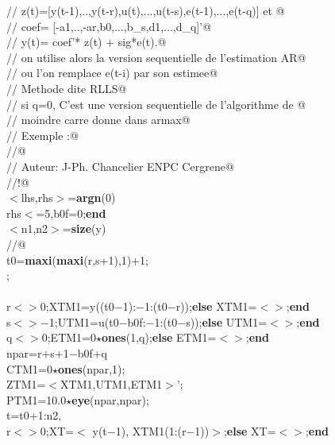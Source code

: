 {\begin{flushleft}
{\cmarg \verb@//        z(t)=[y(t-1),..,y(t-r),u(t),...,u(t-s),e(t-1),...,e(t-q)] et @\\ 
\cmarg \verb@//     coef= [-a1,..,-ar,b0,...,b\_s,d1,...,d\_q]'@\\ 
\cmarg \verb@//     y(t)= coef'* z(t) + sig*e(t).@\\ 
\cmarg \verb@//     on utilise alors la version sequentielle de l'estimation AR@\\ 
\cmarg \verb@//     ou l'on remplace e(t-i) par son estimee@\\ 
\cmarg \verb@//     Methode dite RLLS@\\ 
\cmarg \verb@//     si q=0, C'est une version sequentielle de l'algorithme de @\\ 
\cmarg \verb@//     moindre carre donne dans armax@\\ 
\cmarg \verb@// Exemple :@\\ 
\cmarg \verb@//@\\ 
\cmarg \verb@// Auteur: J-Ph. Chancelier ENPC Cergrene@\\ 
\cmarg \verb@//!@\\ 
\cmarg $<$lhs,rhs$>$={\bf argn}(0)\\ 
 rhs$<$=5,b0f=0;{\bf end}\\ 
\cmarg $<$n1,n2$>$={\bf size}(y)\\ 
\cmarg \verb@//@\\ 
\cmarg t0={\bf maxi}({\bf maxi}(r,s+1),1)+1;\\ 
;\\ 
\cmarg \\ 
 r$<$$>$0;XTM1=y((t0$-$1):$-$1:(t0$-$r));{\bf else} XTM1=$<$$>$;{\bf end}\\ 
 s$<$$>$$-$1;UTM1=u(t0$-$b0f:$-$1:(t0$-$s));{\bf else} UTM1=$<$$>$;{\bf end}\\ 
 q$<$$>$0;ETM1=0$\star${\bf ones}(1,q);{\bf else} ETM1=$<$$>$;{\bf end}\\ 
\cmarg npar=r+s+1$-$b0f+q\\ 
\cmarg CTM1=0$\star${\bf ones}(npar,1);\\ 
\cmarg ZTM1=$<$XTM1,UTM1,ETM1$>$';\\ 
\cmarg PTM1=10.0$\star${\bf eye}(npar,npar);\\ 
 t=t0+1:n2,\\ 
\cmarg \hspace{0.5cm}{\bf if} r$<$$>$0;XT=$<$ y(t$-$1), XTM1(1:(r$-$1))$>$;{\bf else} XT=$<$$>$;{\bf end}\\ 
$$}
\end{flushleft}}
